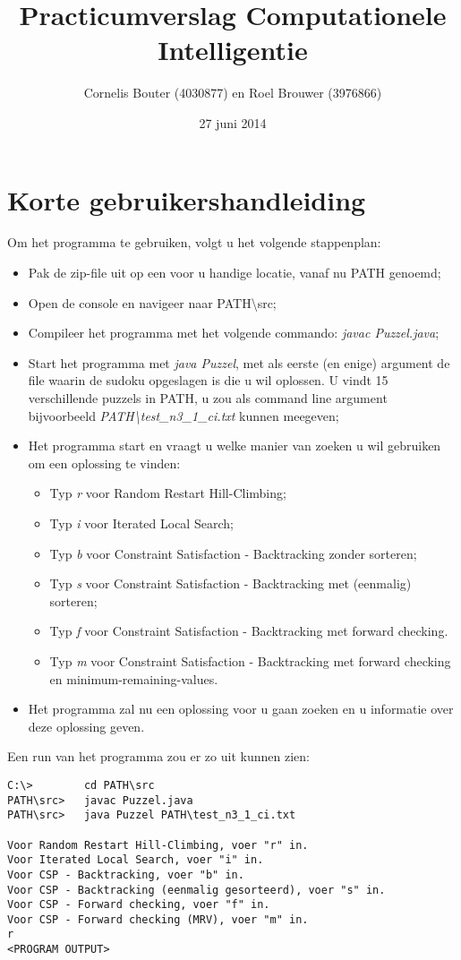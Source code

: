 \documentclass[]{report}
\title{Practicumverslag Computationele Intelligentie}
\author{Cornelis Bouter (4030877) en Roel Brouwer (3976866)}
\date{27 juni 2014}
\begin{document}
\maketitle

\chapter{Korte gebruikershandleiding}
Om het programma te gebruiken, volgt u het volgende stappenplan:
\begin{itemize}
\item Pak de zip-file uit op een voor u handige locatie, vanaf nu PATH genoemd;
\item Open de console en navigeer naar PATH\textbackslash src;
\item Compileer het programma met het volgende commando: \textit{javac Puzzel.java};
\item Start het programma met \textit{java Puzzel}, met als eerste (en enige) argument de file waarin de sudoku opgeslagen is die u wil oplossen. U vindt 15 verschillende puzzels in PATH, u zou als command line argument bijvoorbeeld \textit{PATH\textbackslash test\_n3\_1\_ci.txt} kunnen meegeven;
\item Het programma start en vraagt u welke manier van zoeken u wil gebruiken om een oplossing te vinden:
\begin{itemize}
\item Typ \textit{r} voor Random Restart Hill-Climbing;
\item Typ \textit{i} voor Iterated Local Search;
\item Typ \textit{b} voor Constraint Satisfaction - Backtracking zonder sorteren;
\item Typ \textit{s} voor Constraint Satisfaction - Backtracking met (eenmalig) sorteren;
\item Typ \textit{f} voor Constraint Satisfaction - Backtracking met forward checking.
\item Typ \textit{m} voor Constraint Satisfaction - Backtracking met forward checking en minimum-remaining-values.
\end{itemize}
\item Het programma zal nu een oplossing voor u gaan zoeken en u informatie over deze oplossing geven.
\end{itemize}
Een run van het programma zou er zo uit kunnen zien:

\begin{minipage}{\textwidth}
\begin{lstlisting}
C:\>		cd PATH\src
PATH\src>	javac Puzzel.java
PATH\src>	java Puzzel PATH\test_n3_1_ci.txt

Voor Random Restart Hill-Climbing, voer "r" in.
Voor Iterated Local Search, voer "i" in.
Voor CSP - Backtracking, voer "b" in.
Voor CSP - Backtracking (eenmalig gesorteerd), voer "s" in.
Voor CSP - Forward checking, voer "f" in.
Voor CSP - Forward checking (MRV), voer "m" in.
r
<PROGRAM OUTPUT>
\end{lstlisting}
\end{minipage}
\end{document}
